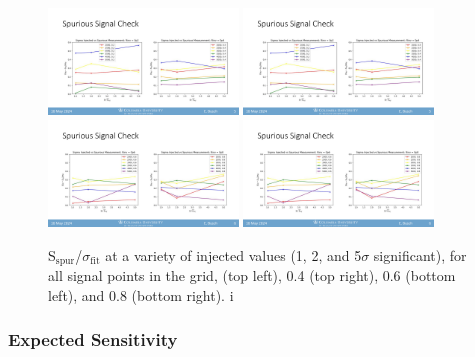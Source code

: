 \begin{figure}[!htbp]
\centering
   \includegraphics[width=0.45\textwidth]{figures/stats/siginj_asimov_02_check}
   \includegraphics[width=0.45\textwidth]{figures/stats/siginj_asimov_04_check}
   \includegraphics[width=0.45\textwidth]{figures/stats/siginj_asimov_06_check}
   \includegraphics[width=0.45\textwidth]{figures/stats/siginj_asimov_08_check}
   \caption{S$_{\text{spur}}$/$\sigma_\text{fit}$ at a variety of injected values (1, 2, and 5$\sigma$ significant), for all signal points in the grid,  (top left), 0.4 (top right), 0.6 (bottom left), and 0.8 (bottom right).
i%
    \label{fig:siginj_asimov_check}}
\end{figure}


\clearpage

\subsubsection{Expected Sensitivity}
\label{subsec:fit_expsens}

